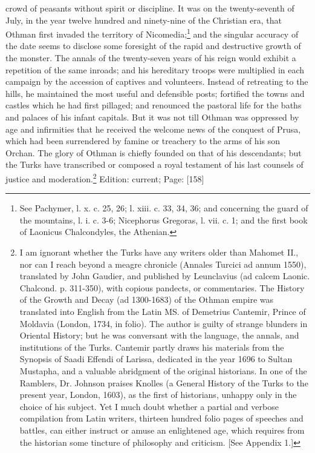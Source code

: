 crowd of peasants without spirit or discipline. It was on the twenty-seventh of July, in the year twelve hundred and ninety-nine of the Christian era, that Othman first invaded the territory of Nicomedia;\footnote{See Pachymer, l. x. c. 25, 26; l. xiii. c. 33, 34, 36; and concerning the guard of the mountains, l. i. c. 3-6; Nicephorus Gregoras, l. vii. c. 1; and the first book of Laonicus Chalcondyles, the Athenian.} and the singular accuracy of the date seems to disclose some foresight of the rapid and destructive growth of the monster. The annals of the twenty-seven years of his reign would exhibit a repetition of the same inroads; and his hereditary troops were multiplied in each campaign by the accession of captives and volunteers. Instead of retreating to the hills, he maintained the most useful and defensible posts; fortified the towns and castles which he had first pillaged; and renounced the pastoral life for the baths and palaces of his infant capitals. But it was not till Othman was oppressed by age and infirmities that he received the welcome news of the conquest of Prusa, which had been surrendered by famine or treachery to the arms of his son Orchan. The glory of Othman is chiefly founded on that of his descendants; but the Turks have transcribed or composed a royal testament of his last counsels of justice and moderation.\footnote{I am ignorant whether the Turks have any writers older than Mahomet II., nor can I reach beyond a meagre chronicle (Annales Turcici ad annum 1550), translated by John Gaudier, and published by Leunclavius (ad calcem Laonic. Chalcond. p. 311-350), with copious pandects, or commentaries. The History of the Growth and Decay (ad 1300-1683) of the Othman empire was translated into English from the Latin MS. of Demetrius Cantemir, Prince of Moldavia (London, 1734, in folio). The author is guilty of strange blunders in Oriental History; but he was conversant with the language, the annals, and institutions of the Turks. Cantemir partly draws his materials from the Synopsis of Saadi Effendi of Larissa, dedicated in the year 1696 to Sultan Mustapha, and a valuable abridgment of the original historians. In one of the Ramblers, Dr. Johnson praises Knolles (a General History of the Turks to the present year, London, 1603), as the first of historians, unhappy only in the choice of his subject. Yet I much doubt whether a partial and verbose compilation from Latin writers, thirteen hundred folio pages of speeches and battles, can either instruct or amuse an enlightened age, which requires from the historian some tincture of philosophy and criticism. [See Appendix 1.]}
Edition: current; Page: [158]

